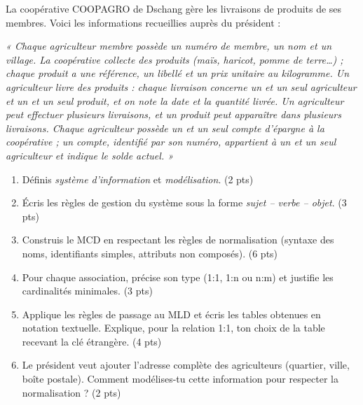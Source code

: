 \documentclass[11pt]{article}
\begin{document}
\begin{exercice}
La coopérative COOPAGRO de Dschang gère les livraisons de produits de ses membres. Voici les informations recueillies auprès du président :

\emph{« Chaque agriculteur membre possède un numéro de membre, un nom et un village. La coopérative collecte des produits (maïs, haricot, pomme de terre\ldots) ; chaque produit a une référence, un libellé et un prix unitaire au kilogramme. Un agriculteur livre des produits : chaque livraison concerne un et un seul agriculteur et un et un seul produit, et on note la date et la quantité livrée. Un agriculteur peut effectuer plusieurs livraisons, et un produit peut apparaître dans plusieurs livraisons. Chaque agriculteur possède un et un seul compte d'épargne à la coopérative ; un compte, identifié par son numéro, appartient à un et un seul agriculteur et indique le solde actuel. »}

\begin{enumerate}
  \item Définis \emph{système d'information} et \emph{modélisation}. \hfill (2 pts)
  \item Écris les règles de gestion du système sous la forme \emph{sujet -- verbe -- objet}. \hfill (3 pts)
  \item Construis le MCD en respectant les règles de normalisation (syntaxe des noms, identifiants simples, attributs non composés). \hfill (6 pts)
  \item Pour chaque association, précise son type (1:1, 1:n ou n:m) et justifie les cardinalités minimales. \hfill (3 pts)
  \item Applique les règles de passage au MLD et écris les tables obtenues en notation textuelle. Explique, pour la relation 1:1, ton choix de la table recevant la clé étrangère. \hfill (4 pts)
  \item Le président veut ajouter l'adresse complète des agriculteurs (quartier, ville, boîte postale). Comment modélises-tu cette information pour respecter la normalisation ? \hfill (2 pts)
\end{enumerate}
\end{exercice}
\end{document}
